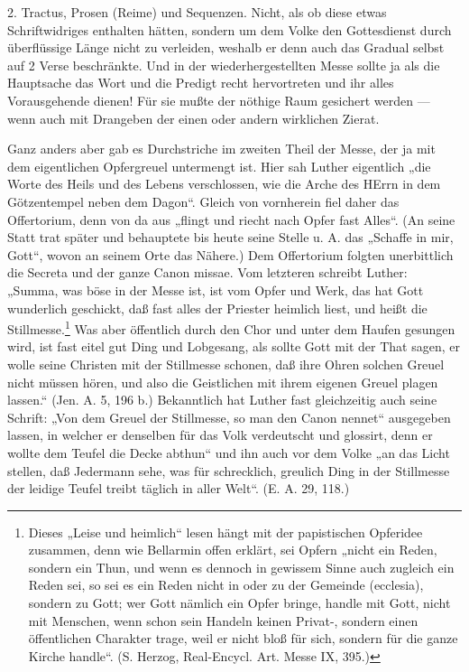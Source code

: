 2. Tractus, Prosen (Reime) und Sequenzen. Nicht, als ob diese etwas Schriftwidriges enthalten hätten, sondern um dem Volke den Gottesdienst durch überflüssige Länge nicht zu verleiden, weshalb er denn auch das Gradual selbst auf 2 Verse beschränkte. Und in der wiederhergestellten Messe sollte ja als die Hauptsache das Wort und die Predigt recht hervortreten und ihr alles Vorausgehende dienen! Für sie mußte der nöthige Raum gesichert werden — wenn auch mit Drangeben der einen oder andern wirklichen Zierat.

Ganz anders aber gab es Durchstriche im zweiten Theil der Messe, der ja mit dem eigentlichen Opfergreuel untermengt ist. Hier sah Luther eigentlich „die Worte des Heils und des Lebens verschlossen, wie die Arche des HErrn in dem Götzentempel neben dem Dagon“. Gleich von vornherein fiel daher das Offertorium, denn von da aus „flingt und riecht nach Opfer fast Alles“. (An seine Statt trat später und behauptete bis heute seine Stelle u. A. das „Schaffe in mir, Gott“, wovon an seinem Orte das Nähere.) Dem Offertorium folgten unerbittlich die Secreta und der ganze Canon missae. Vom letzteren schreibt Luther: „Summa, was böse in der Messe ist, ist vom Opfer und Werk, das hat Gott wunderlich geschickt, daß fast alles der Priester heimlich liest,
und heißt die Stillmesse.\footnote{Dieses „Leise und heimlich“ lesen hängt mit der papistischen Opferidee zusammen, denn wie Bellarmin offen erklärt, sei Opfern „nicht ein Reden, sondern ein Thun, und wenn es dennoch in gewissem Sinne auch zugleich ein Reden sei, so sei es ein Reden nicht in oder zu der Gemeinde (ecclesia), sondern zu Gott; wer Gott nämlich ein Opfer bringe, handle mit Gott, nicht mit Menschen, wenn schon sein Handeln keinen Privat-, sondern einen öffentlichen Charakter trage, weil er nicht bloß für sich, sondern für die ganze Kirche handle“. (S. Herzog, Real-Encycl. Art. Messe IX, 395.)} Was aber öffentlich durch den Chor und unter dem Haufen gesungen wird, ist fast eitel gut Ding und Lobgesang, als sollte Gott mit der That sagen, er wolle seine Christen mit der Stillmesse schonen, daß ihre Ohren solchen Greuel nicht müssen hören, und also die Geistlichen mit ihrem eigenen Greuel plagen lassen.“ (Jen. A. 5, 196 b.) Bekanntlich hat Luther fast gleichzeitig auch seine Schrift: „Von dem Greuel der Stillmesse, so man den Canon nennet“ ausgegeben lassen, in welcher er denselben für das Volk verdeutscht und glossirt, denn er wollte dem Teufel die Decke abthun“ und ihn auch vor dem Volke „an das Licht stellen, daß Jedermann sehe, was für schrecklich, greulich Ding in der Stillmesse der leidige Teufel treibt täglich in aller Welt“. (E. A. 29, 118.)

